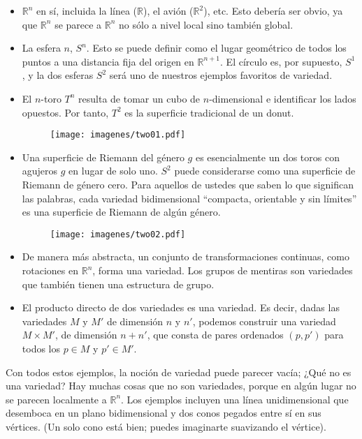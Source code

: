 \documentclass[11pt,b5paper,openany,twoside]{book}
\begin{document}
\begin{itemize}
\item $\mathbb{R}^n$ en sí, incluida la línea ($\mathbb{R}$), el avión ($\mathbb{R}^2$), etc.
Esto debería ser obvio, ya que $\mathbb{R}^n$ se parece a $\mathbb{R}^n$ no sólo a nivel local sino también global.
\item La esfera $n$, $S^n$.
Esto se puede definir como el lugar geométrico de todos los puntos a una distancia fija del origen en $\mathbb{R}^{n+1}$.
El círculo es, por supuesto, $S^1$, y la dos esferas $S^2$ será uno de nuestros ejemplos favoritos de variedad.

\item El $n$-toro $T^n$ resulta de tomar un cubo de $n$-dimensional e identificar los lados opuestos.
Por tanto, $T^2$ es la superficie tradicional de un donut.

\begin{figure}[h]
\centering
\texttt{[image: imagenes/two01.pdf]}
\end{figure}

\item Una superficie de Riemann del género $g$ es esencialmente un dos toros con agujeros $g$ en lugar de solo uno.
$S^2$ puede considerarse como una superficie de Riemann de género cero.
Para aquellos de ustedes que saben lo que significan las palabras, cada variedad bidimensional ``compacta, orientable y sin límites'' es una superficie de Riemann de algún género.

\begin{figure}[h]
\centering
\texttt{[image: imagenes/two02.pdf]}
\end{figure}

\item De manera más abstracta, un conjunto de transformaciones continuas, como rotaciones en $\mathbb{R}^n$, forma una variedad.
Los grupos de mentiras son variedades que también tienen una estructura de grupo.

\item El producto directo de dos variedades es una variedad.
Es decir, dadas las variedades $M$ y $M'$ de dimensión $n$ y $n'$, podemos construir una variedad $M\times M'$, de dimensión $n+n'$, que consta de pares ordenados $(p,p')$ para todos los $p\in M$ y $p'\in M'$.

\end{itemize}

Con todos estos ejemplos, la noción de variedad puede parecer vacía; ¿Qué no es una variedad? Hay muchas cosas que no son variedades, porque en algún lugar no se parecen localmente a $\mathbb{R}^n$.
Los ejemplos incluyen una línea unidimensional que desemboca en un plano bidimensional y dos conos pegados entre sí en sus vértices.
(Un solo cono está bien; puedes imaginarte suavizando el vértice).
\end{document}
